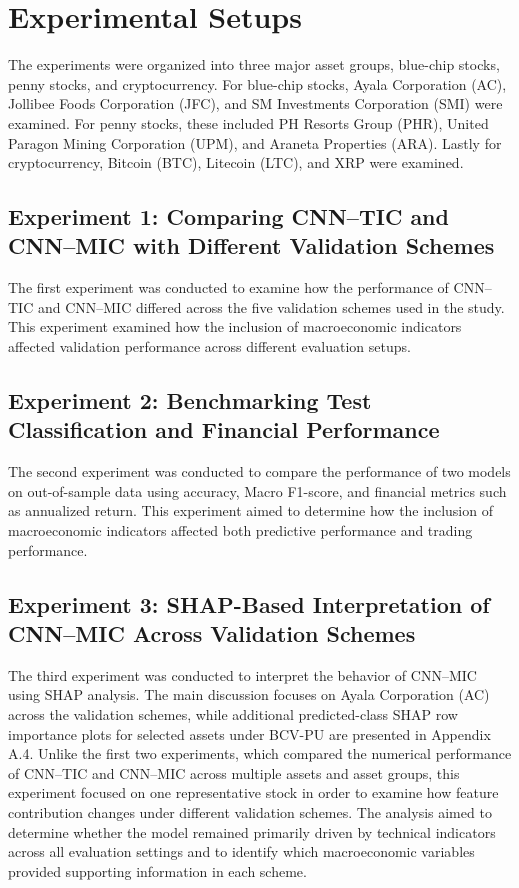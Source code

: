 \section{Experimental Setups}
The experiments were organized into three major asset groups, blue-chip stocks, penny stocks, and cryptocurrency. For blue-chip stocks, Ayala Corporation (AC), Jollibee Foods Corporation (JFC), and SM Investments Corporation (SMI) were examined. For penny stocks, these included PH Resorts Group (PHR), United Paragon Mining Corporation (UPM), and Araneta Properties (ARA). Lastly for cryptocurrency, Bitcoin (BTC), Litecoin (LTC), and XRP were examined.

\subsection{Experiment 1: Comparing CNN--TIC and CNN--MIC with Different Validation Schemes}

The first experiment was conducted to examine how the performance of CNN--TIC and CNN--MIC differed across the five validation schemes used in the study. This experiment examined how the inclusion of macroeconomic indicators affected validation performance across different evaluation setups.

\subsection{Experiment 2: Benchmarking Test Classification and Financial Performance}

The second experiment was conducted to compare the performance of two models on out-of-sample data using accuracy, Macro F1-score, and financial metrics such as annualized return. This experiment aimed to determine how the inclusion of macroeconomic indicators affected both predictive performance and trading performance.

\subsection{Experiment 3: SHAP-Based Interpretation of CNN--MIC Across Validation Schemes}

The third experiment was conducted to interpret the behavior of CNN--MIC using SHAP analysis. The main discussion focuses on Ayala Corporation (AC) across the validation schemes, while additional predicted-class SHAP row importance plots for selected assets under BCV-PU are presented in Appendix A.4. Unlike the first two experiments, which compared the numerical performance of CNN--TIC and CNN--MIC across multiple assets and asset groups, this experiment focused on one representative stock in order to examine how feature contribution changes under different validation schemes. The analysis aimed to determine whether the model remained primarily driven by technical indicators across all evaluation settings and to identify which macroeconomic variables provided supporting information in each scheme.



